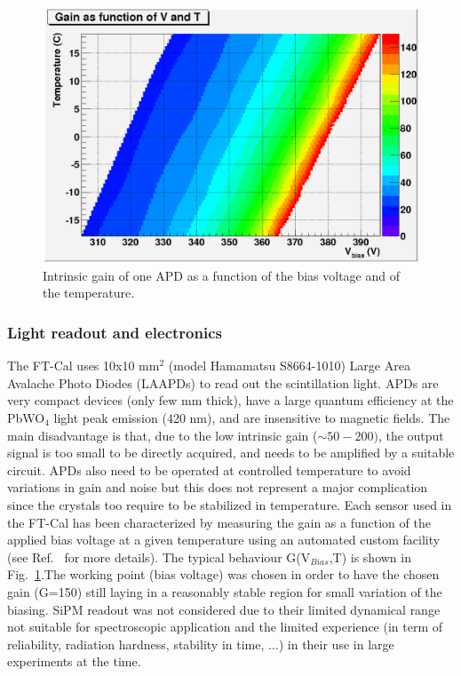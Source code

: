 \begin{figure}[th!]
\centering 
\includegraphics[width=1.0\columnwidth]{./fig/apd5.eps} 
\caption{Intrinsic gain of one APD as a function
of the bias voltage and of the temperature.}
\label{fig:G-V-T} 
\end{figure}

\subsubsection{Light readout and electronics }
The FT-Cal uses 10x10 mm$^2$ (model Hamamatsu S8664-1010) Large Area Avalache Photo Diodes (LAAPDs) to read out the scintillation light. APDs are very compact devices (only few mm thick),  have a large quantum efficiency at the PbWO$_4$ light peak emission (420 nm), and  are insensitive to magnetic fields. The main disadvantage is that, due to
the low intrinsic gain ($\sim 50-200)$, the output signal is too small to be directly acquired, and needs to be amplified
by a suitable circuit. APDs also need
to be operated at controlled temperature to
avoid variations in gain and noise but this does not represent a major complication since the crystals too require to be stabilized in temperature.
Each sensor used in the FT-Cal has been characterized by measuring the gain as a function of the applied bias voltage at a given temperature using an automated  custom facility (see Ref.~\cite{celeAPD} for more details). The typical behaviour G(V$_{Bias}$,T) is shown in Fig.~\ref{fig:G-V-T}.The working point (bias voltage) was chosen in order to have the chosen gain (G=150) still laying in a reasonably stable region for small variation of the biasing. SiPM readout was not considered due to their limited dynamical range not suitable for spectroscopic application and the limited experience (in term of reliability, radiation hardness, stability in time, ...) in their use in large experiments at the time.\\

